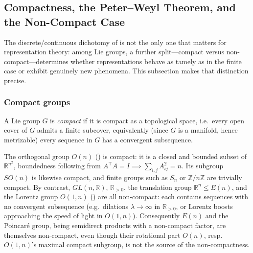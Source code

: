 \documentclass[mathematics,review,submit,moreauthors]{Definitions/mdpi}
\begin{document}

\subsection{Compactness, the Peter--Weyl Theorem, and the Non-Compact Case}
\label{subsec:compactness-peter-weyl}

The discrete/continuous dichotomy of  is not
the only one that matters for representation theory: among Lie groups, a
further split---compact versus non-compact---determines whether
representations behave as tamely as in the finite case or exhibit genuinely
new phenomena. This subsection makes that distinction precise.

\subsubsection{Compact groups}
\label{subsubsec:compact-groups}

\begin{Definition}
\label{def:compact-group}
A Lie group $G$ is \emph{compact} if it is compact as a topological space,
i.e.\ every open cover of $G$ admits a finite subcover, equivalently (since
$G$ is a manifold, hence metrizable) every sequence in $G$ has a convergent
subsequence.
\end{Definition}

\begin{Example}
\label{ex:compactness}
The orthogonal group $O(n)$ () is compact: it is a
closed and bounded subset of $\mathbb{R}^{n^2}$, boundedness following from
$A^\top A = I \implies \sum_{i,j} A_{ij}^2 = n$. Its subgroup $SO(n)$ is
likewise compact, and finite groups such as $S_n$ or $\mathbb{Z}/n\mathbb{Z}$
are trivially compact. By contrast, $GL(n,\mathbb{R})$, $\mathbb{R}_{>0}$,
the translation group $\mathbb{R}^n \leq E(n)$, and the Lorentz group
$O(1,n)$ () are all non-compact: each contains
sequences with no convergent subsequence (e.g.\ dilations $\lambda \to
\infty$ in $\mathbb{R}_{>0}$, or Lorentz boosts approaching the speed of
light in $O(1,n)$). Consequently $E(n)$ and the Poincar\'e group, being
semidirect products with a non-compact factor, are themselves non-compact,
even though their rotational part $O(n)$, resp.\ $O(1,n)$'s maximal compact
subgroup, is not the source of the non-compactness.
\end{Example}
\end{document}
